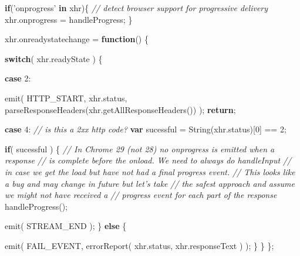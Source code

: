 \documentclass[12pt, ]{article}
\newenvironment{Shaded}{}{}
\newcommand{\KeywordTok}[1]{\textcolor[rgb]{0.00,0.44,0.13}{\textbf{{#1}}}}
\newcommand{\DecValTok}[1]{\textcolor[rgb]{0.25,0.63,0.44}{{#1}}}
\newcommand{\StringTok}[1]{\textcolor[rgb]{0.25,0.44,0.63}{{#1}}}
\newcommand{\CommentTok}[1]{\textcolor[rgb]{0.38,0.63,0.69}{\textit{{#1}}}}
\newcommand{\OtherTok}[1]{\textcolor[rgb]{0.00,0.44,0.13}{{#1}}}
\newcommand{\FunctionTok}[1]{\textcolor[rgb]{0.02,0.16,0.49}{{#1}}}
\newcommand{\NormalTok}[1]{{#1}}
\begin{document}
\begin{Shaded}
\begin{Highlighting}[]
   
   \KeywordTok{if}\NormalTok{(}\StringTok{'onprogress'} \KeywordTok{in} \NormalTok{xhr)\{  }\CommentTok{// detect browser support for progressive delivery}
      \OtherTok{xhr}\NormalTok{.}\FunctionTok{onprogress} \NormalTok{= handleProgress;}
   \NormalTok{\}}
   
   \OtherTok{xhr}\NormalTok{.}\FunctionTok{onreadystatechange} \NormalTok{= }\KeywordTok{function}\NormalTok{() \{}
      
      \KeywordTok{switch}\NormalTok{( }\OtherTok{xhr}\NormalTok{.}\FunctionTok{readyState} \NormalTok{) \{}
               
         \KeywordTok{case} \DecValTok{2}\NormalTok{:       }
         
            \FunctionTok{emit}\NormalTok{(}
               \NormalTok{HTTP_START, }
               \OtherTok{xhr}\NormalTok{.}\FunctionTok{status}\NormalTok{,}
               \FunctionTok{parseResponseHeaders}\NormalTok{(}\OtherTok{xhr}\NormalTok{.}\FunctionTok{getAllResponseHeaders}\NormalTok{()) );}
            \KeywordTok{return}\NormalTok{;}
            
         \KeywordTok{case} \DecValTok{4}\NormalTok{:       }
            \CommentTok{// is this a 2xx http code?}
            \KeywordTok{var} \NormalTok{sucessful = }\FunctionTok{String}\NormalTok{(}\OtherTok{xhr}\NormalTok{.}\FunctionTok{status}\NormalTok{)[}\DecValTok{0}\NormalTok{] == }\DecValTok{2}\NormalTok{;}
            
            \KeywordTok{if}\NormalTok{( sucessful ) \{}
               \CommentTok{// In Chrome 29 (not 28) no onprogress is emitted when a response}
               \CommentTok{// is complete before the onload. We need to always do handleInput}
               \CommentTok{// in case we get the load but have not had a final progress event.}
               \CommentTok{// This looks like a bug and may change in future but let's take}
               \CommentTok{// the safest approach and assume we might not have received a }
               \CommentTok{// progress event for each part of the response}
               \FunctionTok{handleProgress}\NormalTok{();}
               
               \FunctionTok{emit}\NormalTok{( STREAM_END );}
            \NormalTok{\} }\KeywordTok{else} \NormalTok{\{}
            
               \FunctionTok{emit}\NormalTok{( }
                  \NormalTok{FAIL_EVENT, }
                  \FunctionTok{errorReport}\NormalTok{(}
                     \OtherTok{xhr}\NormalTok{.}\FunctionTok{status}\NormalTok{, }
                     \OtherTok{xhr}\NormalTok{.}\FunctionTok{responseText}
                  \NormalTok{)}
               \NormalTok{);}
            \NormalTok{\}}
      \NormalTok{\}}
   \NormalTok{\};}


\end{Highlighting}
\end{Shaded}
\end{document}
